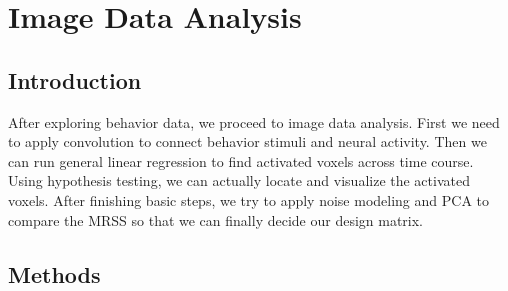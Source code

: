 \section{Image Data Analysis}
\subsection{Introduction}
\noindent
After exploring behavior data, we proceed to image data analysis.  First we need to apply
 convolution to connect behavior stimuli and neural activity. Then we can run general linear
  regression to find activated voxels across time course. Using hypothesis testing, we can 
  actually locate and visualize the activated voxels. After finishing basic steps, we try to 
  apply noise modeling and PCA to compare the MRSS so that we can finally decide our design matrix.

\subsection{Methods}
